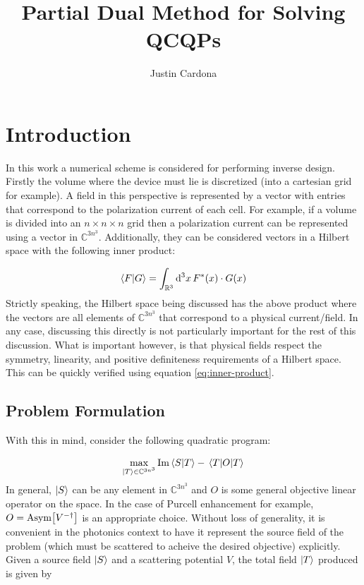 \documentclass[reprint]{revtex4-2}
\newcommand{\asym}[1]{\text{Asym}\qty[#1]}
\begin{document}
\title{Partial Dual Method for Solving QCQPs}
\author{Justin Cardona}
\begin{abstract}
\end{abstract}
\maketitle


\section{Introduction}
\label{sec:introduction}
In this work a numerical scheme is considered for performing inverse design. Firstly the volume where the device must lie is discretized (into a cartesian grid for example). A field in this perspective is represented by a vector with entries that correspond to the polarization current of each cell. For example, if a volume is divided into an $n\times n\times n$ grid then a polarization current can be represented using a vector in $\mathbb{C}^{3n^3}$. Additionally, they can be considered vectors in a Hilbert space with the following inner product:

\begin{align}
	\braket{F}{G} = \int_{\mathbb{R}^3} \dd[3]{x} F^*(x)\cdot G(x)
	\label{eq:inner-product}
\end{align}
Strictly speaking, the Hilbert space being discussed has the above product where the vectors are all elements of $\mathbb{C}^{3n^3}$ that correspond to a physical current/field. In any case, discussing this directly is not particularly important for the rest of this discussion. What is important however, is that physical fields respect the symmetry, linearity, and positive definiteness requirements of a Hilbert space. This can be quickly verified using equation \ref{eq:inner-product}.

\subsection{Problem Formulation}
\label{ssec:formulation}
With this in mind, consider the following quadratic program:

\begin{align}
	\max_{\ket{T}\in\mathbb{C}^{3n^3}} \Im\braket{S}{T} - \ev{O}{T}
\end{align}
In general, $\ket{S}$ can be any element in $\mathbb{C}^{3n^3}$ and $O$ is some general objective linear operator on the space. In the case of Purcell enhancement for example, $O=\asym{V^{-\dagger}}$ is an appropriate choice. Without loss of generality, it is convenient in the photonics context to have it represent the source field of the problem (which must be scattered to acheive the desired objective) explicitly. Given a source field $\ket{S}$ and a scattering potential $V$, the total field $\ket{T}$ produced is given by
\end{document}
